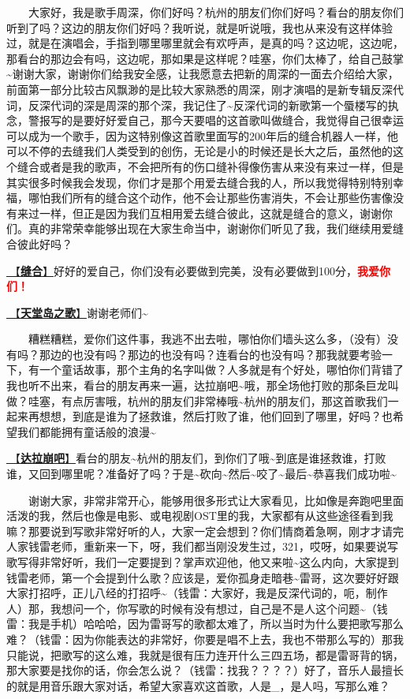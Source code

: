 \documentclass[]{ctexbook}
\begin{document}
  大家好，我是歌手周深，你们好吗？杭州的朋友们你们好吗？看台的朋友你们听到了吗？这边的朋友你们好吗？我听说，就是听说哦，我也从来没有这样体验过，就是在演唱会，手指到哪里哪里就会有欢呼声，是真的吗？这边呢，这边呢，那看台的那边会有吗，这边呢，那如果是这样呢？哇塞，你们太棒了，给自己鼓掌\textasciitilde 谢谢大家，谢谢你们给我安全感，让我愿意去把新的周深的一面去介绍给大家，前面第一部分比较古风飘渺的是比较大家熟悉的周深，刚才演唱的是新专辑反深代词，反深代词的深是周深的那个深，我记住了\textasciitilde 反深代词的新歌第一个蜃楼写的执念，警报写的是要好好爱自己，那今天要唱的这首歌叫做缝合，我觉得自己很幸运可以成为一个歌手，因为这特别像这首歌里面写的200年后的缝合机器人一样，他可以不停的去缝我们人类受到的创伤，无论是小的时候还是长大之后，虽然他的这个缝合或者是我的歌声，不会把所有的伤口缝补得像伤害从来没有来过一样，但是其实很多时候我会发现，你们才是那个用爱去缝合我的人，所以我觉得特别特别幸福，哪怕我们所有的缝合这个动作，他不会让那些伤害消失，不会让那些伤害像没有来过一样，但正是因为我们互相用爱去缝合彼此，这就是缝合的意义，谢谢你们。真的非常荣幸能够出现在大家生命当中，谢谢你们听见了我，我们继续用爱缝合彼此好吗？

\hyperref[fix-you]{🎵【\textbf{缝合}】}好好的爱自己，你们没有必要做到完美，没有必要做到100分，\textbf{\textcolor{red}{我爱你们！}}

\hyperref[haven-song]{🎵【\textbf{天堂岛之歌}】}谢谢老师们\textasciitilde{}

  糟糕糟糕，爱你们这件事，我逃不出去啦，哪怕你们墙头这么多，（没有）没有吗？那边的也没有吗？那边的也没有吗？连看台的也没有吗？那我就要考验一下，有一个童话故事，那个主角的名字叫做？人多就是有个好处，哪怕你们背错了我也听不出来，看台的朋友再来一遍，达拉崩吧\textasciitilde 哦，那全场他打败的那条巨龙叫做？哇塞，有点厉害哦，杭州的朋友们非常棒哦\textasciitilde 杭州的朋友们，那这首歌我们一起来再想想，到底是谁为了拯救谁，然后打败了谁，他们回到了哪里，好吗？也希望我们都能拥有童话般的浪漫\textasciitilde{}

\hyperref[dalabengba]{🎵【\textbf{达拉崩吧}】}看台的朋友\textasciitilde 杭州的朋友们，到你们了哦\textasciitilde 到底是谁拯救谁，打败谁，又回到哪里呢？准备好了吗？于是\textasciitilde 砍向\textasciitilde 然后\textasciitilde 咬了\textasciitilde 最后\textasciitilde 恭喜我们成功啦\textasciitilde{}

  谢谢大家，非常非常开心，能够用很多形式让大家看见，比如像是奔跑吧里面活泼的我，然后也像是电影、或电视剧OST里的我，大家都有从这些途径看到我嘛？那要说到写歌非常好听的人，大家一定会想到？你们情商着急啊，刚才才请完人家钱雷老师，重新来一下，呀，我们都当刚没发生过，321，哎呀，如果要说写歌写得非常好听，我们一定要提到？掌声欢迎他，他又来啦\textasciitilde 这么内向，大家提到钱雷老师，第一个会提到什么歌？应该是，爱你孤身走暗巷\textasciitilde 雷哥，这次要好好跟大家打招呼，正儿八经的打招呼\textasciitilde（钱雷：大家好，我是反深代词的，呃，制作人）那，我想问一个，你写歌的时候有没有想过，自己是不是人这个问题\textasciitilde（钱雷：我是手机）哈哈哈，因为雷哥写的歌都太难了，所以当时为什么要把歌写那么难？（钱雷：因为你能表达的非常好，你要是唱不上去，我也不带那么写的）那我只能说，把歌写的这么难，我就是很有压力连开什么三四五场，都是雷哥背的锅，那大家要是找你的话，你会怎么说？（钱雷：找我？？？？）好了，音乐人最擅长的就是用音乐跟大家对话，希望大家喜欢这首歌，人是\_，是人吗，写那么难？
\end{document}
